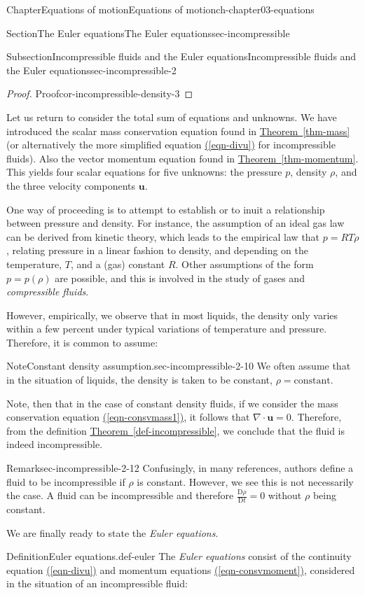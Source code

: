 \documentclass[oneside,10pt,]{book}
\newcommand{\xreffont}{\relax}
\numberwithin{equation}{section}
\newcommand{\DD}[2]{\frac{\mathrm{D}#1}{\mathrm{D}#2}}
\newcommand{\bu}{\boldsymbol{u}}
\begin{document}
\begin{chapterptx}{Chapter}{Equations of motion}{}{Equations of motion}{}{}{ch-chapter03-equations}
\begin{sectionptx}{Section}{The Euler equations}{}{The Euler equations}{}{}{sec-incompressible}
\begin{subsectionptx}{Subsection}{Incompressible fluids and the Euler equations}{}{Incompressible fluids and the Euler equations}{}{}{sec-incompressible-2}
\begin{proof}{Proof}{}{cor-incompressible-density-3}
\end{proof}
Let us return to consider the total sum of equations and unknowns. We have introduced the scalar mass conservation equation found in \hyperref[thm-mass]{Theorem~{\xreffont\ref{thm-mass}}} (or alternatively the more simplified equation \hyperref[eqn-divu]{({\xreffont\ref{eqn-divu}})} for incompressible fluids). Also the vector momentum equation found in \hyperref[thm-momentum]{Theorem~{\xreffont\ref{thm-momentum}}}. This yields four scalar equations for five unknowns: the pressure \(p\), density \(\rho\), and the three velocity components \(\bu\).%
\par
One way of proceeding is to attempt to establish or to inuit a relationship between pressure and density. For instance, the assumption of an ideal gas law can be derived from kinetic theory, which leads to the empirical law that \(p = RT\rho\), relating pressure in a linear fashion to density, and depending on the temperature, \(T\), and a (gas) constant \(R\). Other assumptions of the form \(p = p(\rho)\) are possible, and this is involved in the study of gases and \emph{compressible fluids}.%
\par
However, empirically, we observe that in most liquids, the density only varies within a few percent under typical variations of temperature and pressure. Therefore, it is common to assume:%
\begin{note}{Note}{Constant density assumption.}{sec-incompressible-2-10}%
We often assume that in the situation of liquids, the density is taken to be constant, \(\rho = \textrm{constant}\).%
\end{note}
Note, then that in the case of constant density fluids, if we consider the mass conservation equation \hyperref[eqn-consvmass1]{({\xreffont\ref{eqn-consvmass1}})}, it follows that \(\nabla \cdot \bu = 0\). Therefore, from the definition \hyperref[def-incompressible]{Theorem~{\xreffont\ref{def-incompressible}}}, we conclude that the fluid is indeed incompressible.%
\begin{remark}{Remark}{}{sec-incompressible-2-12}%
Confusingly, in many references, authors define a fluid to be incompressible if \(\rho\) is constant. However, we see this is not necessarily the case. A fluid can be incompressible and therefore \(\DD{\rho}{t} = 0\) without \(\rho\) being constant.%
\end{remark}
We are finally ready to state the \emph{Euler equations}.%
\begin{definition}{Definition}{Euler equations.}{def-euler}%
The \emph{Euler equations} consist of the continuity equation \hyperref[eqn-divu]{({\xreffont\ref{eqn-divu}})} and momentum equations \hyperref[eqn-consvmoment]{({\xreffont\ref{eqn-consvmoment}})}, considered in the situation of an incompressible fluid:%

\end{definition}
\end{subsectionptx}
\end{sectionptx}
\end{chapterptx}
\end{document}
